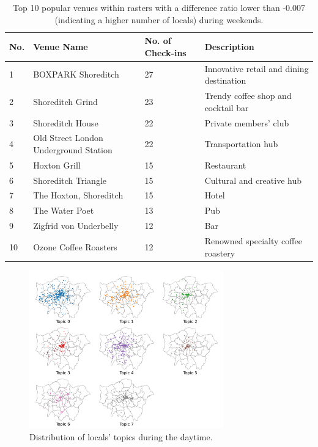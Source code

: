\documentclass{article}
\theoremstyle{definition}
\theoremstyle{remark}
\begin{document}
\begin{table}[!h]
\centering
\caption{\label{tab:popular_venues_localspop_weekend}Top 10 popular venues within rasters with a difference ratio lower than -0.007 (indicating a higher number of locals) during weekends.}
\begin{adjustbox}{max width=\textwidth, margin=0cm}
\begin{threeparttable}
\begin{tabular}{lp{5cm}lp{4cm}} \hline
No. & Venue Name & No. of Check-ins & Description \\ \hline
1 & BOXPARK Shoreditch & 27 & Innovative retail and dining destination \\
2 & Shoreditch Grind & 23 & Trendy coffee shop and cocktail bar \\
3 & Shoreditch House & 22 & Private members' club \\
4 & Old Street London Underground Station & 22 & Transportation hub \\
5 & Hoxton Grill & 15 & Restaurant \\
6 & Shoreditch Triangle & 15 & Cultural and creative hub \\
7 & The Hoxton, Shoreditch & 15 & Hotel \\
8 & The Water Poet & 13 & Pub \\
9 & Zigfrid von Underbelly & 12 & Bar \\
10 & Ozone Coffee Roasters & 12 & Renowned specialty coffee roastery \\ \hline
\end{tabular}
\end{threeparttable}
\end{adjustbox}
\end{table}


\begin{figure}[!h]
\centering
\includegraphics[width=0.75\textwidth]{figures/topics_distribution_daytime_locals.png}
\caption{\label{fig:topics_distribution_daytime_locals}Distribution of locals' topics during the daytime.}
\end{figure}
\end{document}
